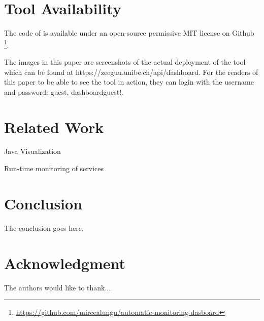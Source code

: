 \documentclass[conference]{IEEEtran}
\begin{document}
\section{Tool Availability}

The code of \tool is available under an open-source permissive MIT license on Github \footnote{\url{https://github.com/mircealungu/automatic-monitoring-dasboard}}.

The images in this paper are screenshots of the actual deployment of the tool which can be found at {https://zeeguu.unibe.ch/api/dashboard}. For the readers of this paper to be able to see the tool in action, they can login with the username and password: guest, dashboardguest!. 

\section{Related Work}

Java Visualization \cite{Pauw02a}

Run-time monitoring of services \cite{ghezzi2007run}

\section{Conclusion}
The conclusion goes here.






\section*{Acknowledgment}


The authors would like to thank...










\end{document}
